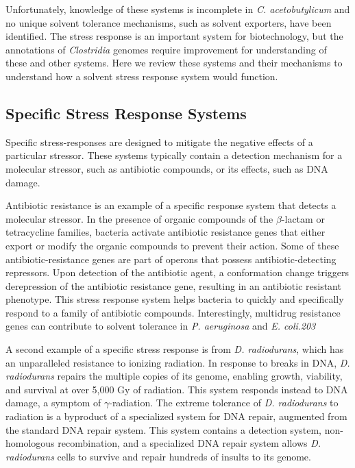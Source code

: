 Unfortunately, knowledge of these systems is incomplete in \textit{C. acetobutylicum} and no unique solvent tolerance mechanisms, such as solvent exporters, have been identified. The stress response is an important system for biotechnology, but the annotations of \textit{Clostridia} genomes require improvement for understanding of these and other systems. Here we review these systems and their mechanisms to understand how a solvent stress response system would function.


\subsection{Specific Stress Response Systems}
Specific stress-responses are designed to mitigate the negative effects of a particular stressor. These systems typically contain a detection mechanism for a molecular stressor, such as antibiotic compounds,\cite{127} or its effects, such as DNA damage.\cite{128}

Antibiotic resistance is an example of a specific response system that detects a molecular stressor. In the presence of organic compounds of the $\beta$-lactam\cite{127} or tetracycline families,\cite{130} bacteria activate antibiotic resistance genes that either export or modify the organic compounds to prevent their action. Some of these antibiotic-resistance genes are part of operons that possess antibiotic-detecting repressors.\cite{127} Upon detection of the antibiotic agent, a conformation change triggers derepression of the antibiotic resistance gene, resulting in an antibiotic resistant phenotype. This stress response system helps bacteria to quickly and specifically respond to a family of antibiotic compounds. Interestingly, multidrug resistance genes can contribute to solvent tolerance in \textit{P. aeruginosa}\cite{202} and \textit{E. coli}.\textit{203}

A second example of a specific stress response is from \textit{D. radiodurans}, which has an unparalleled resistance to ionizing radiation.\cite{129} In response to breaks in DNA, \textit{D. radiodurans} repairs the multiple copies of its genome, enabling growth, viability, and survival at over 5,000 Gy of radiation.\cite{129} This system responds instead to DNA damage, a symptom of $\gamma$-radiation. The extreme tolerance of \textit{D. radiodurans} to radiation is a byproduct of a specialized system for DNA repair,\cite{129} augmented from the standard DNA repair system.\cite{128} This system contains a detection system, non-homologous recombination, and a specialized DNA repair system allows \textit{D. radiodurans} cells to survive and repair hundreds of insults to its genome. 

